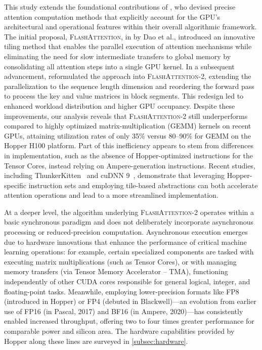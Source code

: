 This study extends the foundational contributions of \citet{dao2022flashattention}, who devised precise attention computation methods that explicitly account for the GPU's architectural and operational features within their overall algorithmic framework. The initial proposal, \textsc{FlashAttention}, in \citep{dao2022flashattention} by Dao et al., introduced an innovative tiling method that enables the parallel execution of attention mechanisms while eliminating the need for slow intermediate transfers to global memory by consolidating all attention steps into a single GPU kernel. In a subsequent advancement, \citet{dao2023flashattention2} reformulated the approach into \textsc{FlashAttention-2}, extending the parallelization to the sequence length dimension and reordering the forward pass to process the key and value matrices in block segments. This redesign led to enhanced workload distribution and higher GPU occupancy. Despite these improvements, our analysis reveals that \textsc{FlashAttention-2} still underperforms compared to highly optimized matrix-multiplication (GEMM) kernels on recent GPUs, attaining utilization rates of only 35\% versus 80–90\% for GEMM on the Hopper H100 platform. Part of this inefficiency appears to stem from differences in implementation, such as the absence of Hopper-optimized instructions for the Tensor Cores, instead relying on Ampere-generation instructions. Recent studies, including ThunkerKitten~\citep{spector2024thunder} and cuDNN 9~\citep{cudnn9}, demonstrate that leveraging Hopper-specific instruction sets and employing tile-based abstractions can both accelerate attention operations and lead to a more streamlined implementation.

At a deeper level, the algorithm underlying \textsc{FlashAttention-2} operates within a basic synchronous paradigm and does not deliberately incorporate asynchronous processing or reduced-precision computation. Asynchronous execution emerges due to hardware innovations that enhance the performance of critical machine learning operations: for example, certain specialized components are tasked with executing matrix multiplications (such as Tensor Cores), or with managing memory transfers (via Tensor Memory Accelerator -- TMA), functioning independently of other CUDA cores responsible for general logical, integer, and floating-point tasks. Meanwhile, employing lower-precision formats like FP8 (introduced in Hopper) or FP4 (debuted in Blackwell)—an evolution from earlier use of FP16 (in Pascal, 2017) and BF16 (in Ampere, 2020)—has consistently enabled increased throughput, offering two to four times greater performance for comparable power and silicon area. The hardware capabilities provided by Hopper along these lines are surveyed in \cref{subsec:hardware}.

